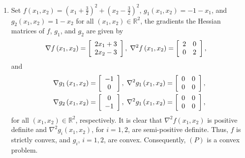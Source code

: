 \documentclass[a4paper]{article}
\numberwithin{equation}{section}
\begin{document}
\begin{enumerate}
\item Set $f\left( {{x_1},{x_2}} \right) = {\left( {{x_1} + \frac{3}{2}} \right)^2} + {\left( {{x_2} - \frac{3}{2}} \right)^2}$, ${g_1}\left( {{x_1},{x_2}} \right) = -1 - {x_1}$, and ${g_2}\left( {{x_1},{x_2}} \right) = 1 - {x_2}$ for all $\left(x_1,x_2\right)\in \mathbb{R}^2$, the gradients the Hessian matrices of $f$, $g_1$, and $g_2$ are given by
\begin{align}
\nabla f\left( {{x_1},{x_2}} \right) &= \left[ {\begin{array}{*{20}{c}}
{2{x_1} + 3}\\
{2{x_2} - 3}
\end{array}} \right],\hspace{0.1cm} {\nabla ^2}f\left( {{x_1},{x_2}} \right) = \left[ {\begin{array}{*{20}{c}}
2&0\\
0&2
\end{array}} \right],
\end{align}
and 
\begin{align}
\nabla {g_1}\left( {{x_1},{x_2}} \right)& = \left[ {\begin{array}{*{20}{c}}
-1\\
0
\end{array}} \right],\hspace{0.1cm} {\nabla ^2}{g_1}\left( {{x_1},{x_2}} \right) = \left[ {\begin{array}{*{20}{c}}
0&0\\
0&0
\end{array}} \right],\\
\nabla {g_2}\left( {{x_1},{x_2}} \right) &= \left[ {\begin{array}{*{20}{c}}
0\\
{ - 1}
\end{array}} \right],\hspace{0.1cm} {\nabla ^2}{g_1}\left( {{x_1},{x_2}} \right) = \left[ {\begin{array}{*{20}{c}}
0&0\\
0&0
\end{array}} \right],
\end{align}
for all $\left(x_1,x_2\right)\in \mathbb{R}^2$, respectively. It is clear that ${\nabla ^2}f\left( {{x_1},{x_2}} \right)$ is positive definite and ${\nabla ^2}{g_i}\left( {{x_1},{x_2}} \right)$, for $i=1,2$, are semi-positive definite. Thus, $f$ is strictly convex, and $g_i$, $i=1,2$, are convex. Consequently, $\left(P\right)$ is a convex problem.


\end{enumerate}
\end{document}
